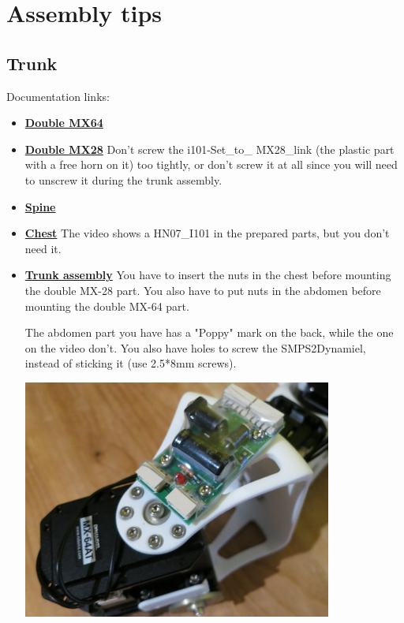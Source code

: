\documentclass{article}
\begin{document}
\section{Assembly tips}

\subsection{Trunk} 
 
Documentation links:

\begin{itemize}
\item \textbf{\href{https://github.com/poppy-project/Robotis-library/blob/master/doc/en/double\_MX64\_assembly.md}{Double MX64}}
\item \textbf{\href{https://github.com/poppy-project/Robotis-library/blob/master/doc/en/double\_MX28\_assembly.md}{Double MX28}} Don't screw the i101-Set\_to\_ MX28\_link (the plastic part with a free horn on it) too tightly, or don't screw it at all since you will need to unscrew it during the trunk assembly.
\item \textbf{\href{https://github.com/poppy-project/Poppy-multiarticulated-torso/blob/master/doc/en/subassembly/spine\_assembly\_instructions.md}{Spine}}
\item \textbf{\href{https://github.com/poppy-project/Poppy-multiarticulated-torso/blob/master/doc/en/subassembly/chest\_assembly\_instructions.md}{Chest}} The video shows a HN07\_I101 in the prepared parts, but you don't need it.
\item \textbf{\href{https://github.com/poppy-project/Poppy-multiarticulated-torso/blob/master/doc/en/5\_DoFs\_humanoid\_spine.md}{Trunk assembly}} You have to insert the nuts in the chest before mounting the double MX-28 part. You also have to put nuts in the abdomen before mounting the double MX-64 part.

The abdomen part you have has a "Poppy" mark on the back, while the one on the video don't. You also have holes to screw the SMPS2Dynamiel, instead of sticking it (use 2.5*8mm screws).
\begin{center}
  \includegraphics[width=0.8\textwidth]{img/screwed_SMPS}
\end{center}
\end{itemize}
\end{document}
